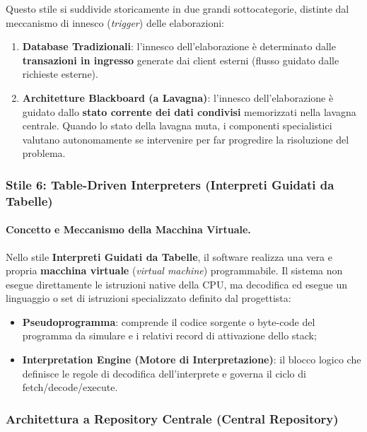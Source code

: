 \documentclass[12pt]{extarticle}
\begin{document}
\noindent Questo stile si suddivide storicamente in due grandi sottocategorie, distinte dal meccanismo di innesco (\textit{trigger}) delle elaborazioni:
\begin{enumerate}
    \item \textbf{Database Tradizionali}: l'innesco dell'elaborazione è determinato dalle \textbf{transazioni in ingresso} generate dai client esterni (flusso guidato dalle richieste esterne).
    \item \textbf{Architetture Blackboard (a Lavagna)}: l'innesco dell'elaborazione è guidato dallo \textbf{stato corrente dei dati condivisi} memorizzati nella lavagna centrale. Quando lo stato della lavagna muta, i componenti specialistici valutano autonomamente se intervenire per far progredire la risoluzione del problema.
\end{enumerate}

\subsubsection{Stile 6: Table-Driven Interpreters (Interpreti Guidati da Tabelle)}

\paragraph{Concetto e Meccanismo della Macchina Virtuale.}
Nello stile \textbf{Interpreti Guidati da Tabelle}, il software realizza una vera e propria \textbf{macchina virtuale} (\textit{virtual machine}) programmabile. Il sistema non esegue direttamente le istruzioni native della CPU, ma decodifica ed esegue un linguaggio o set di istruzioni specializzato definito dal progettista:
\begin{itemize}
    \item \textbf{Pseudoprogramma}: comprende il codice sorgente o byte-code del programma da simulare e i relativi record di attivazione dello stack;
    \item \textbf{Interpretation Engine (Motore di Interpretazione)}: il blocco logico che definisce le regole di decodifica dell'interprete e governa il ciclo di fetch/decode/execute.
\end{itemize}

\subsubsection{Architettura a Repository Centrale (Central Repository)}
\end{document}
